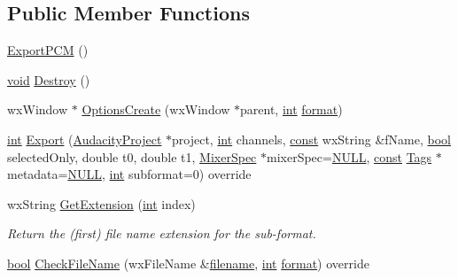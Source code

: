 \subsection*{Public Member Functions}
\begin{DoxyCompactItemize}
\item 
\hyperlink{class_export_p_c_m_aac3274e3407707edabbdc2b770ec5227}{Export\+P\+CM} ()
\item 
\hyperlink{sound_8c_ae35f5844602719cf66324f4de2a658b3}{void} \hyperlink{class_export_p_c_m_abcb80d618eb91c034cecc63dee678968}{Destroy} ()
\item 
wx\+Window $\ast$ \hyperlink{class_export_p_c_m_a35f9d0b0c2b57022bf2cf982489e959a}{Options\+Create} (wx\+Window $\ast$parent, \hyperlink{xmltok_8h_a5a0d4a5641ce434f1d23533f2b2e6653}{int} \hyperlink{_export_p_c_m_8cpp_a317afff57d87a89158c2b038d37b2b08}{format})
\item 
\hyperlink{xmltok_8h_a5a0d4a5641ce434f1d23533f2b2e6653}{int} \hyperlink{class_export_p_c_m_a76bda59ce41f9eef8f168914d6285abb}{Export} (\hyperlink{class_audacity_project}{Audacity\+Project} $\ast$project, \hyperlink{xmltok_8h_a5a0d4a5641ce434f1d23533f2b2e6653}{int} channels, \hyperlink{getopt1_8c_a2c212835823e3c54a8ab6d95c652660e}{const} wx\+String \&f\+Name, \hyperlink{mac_2config_2i386_2lib-src_2libsoxr_2soxr-config_8h_abb452686968e48b67397da5f97445f5b}{bool} selected\+Only, double t0, double t1, \hyperlink{class_mixer_spec}{Mixer\+Spec} $\ast$mixer\+Spec=\hyperlink{px__mixer_8h_a070d2ce7b6bb7e5c05602aa8c308d0c4}{N\+U\+LL}, \hyperlink{getopt1_8c_a2c212835823e3c54a8ab6d95c652660e}{const} \hyperlink{class_tags}{Tags} $\ast$metadata=\hyperlink{px__mixer_8h_a070d2ce7b6bb7e5c05602aa8c308d0c4}{N\+U\+LL}, \hyperlink{xmltok_8h_a5a0d4a5641ce434f1d23533f2b2e6653}{int} subformat=0) override
\item 
wx\+String \hyperlink{class_export_p_c_m_afab2bd1800b6a1efe1ccb69710e02f97}{Get\+Extension} (\hyperlink{xmltok_8h_a5a0d4a5641ce434f1d23533f2b2e6653}{int} index)
\begin{DoxyCompactList}\small\item\em Return the (first) file name extension for the sub-\/format. \end{DoxyCompactList}\item 
\hyperlink{mac_2config_2i386_2lib-src_2libsoxr_2soxr-config_8h_abb452686968e48b67397da5f97445f5b}{bool} \hyperlink{class_export_p_c_m_a16f1633b8326c80086c9ed4041dbac1e}{Check\+File\+Name} (wx\+File\+Name \&\hyperlink{test__portburn_8cpp_a7efa5e9c7494c7d4586359300221aa5d}{filename}, \hyperlink{xmltok_8h_a5a0d4a5641ce434f1d23533f2b2e6653}{int} \hyperlink{_export_p_c_m_8cpp_a317afff57d87a89158c2b038d37b2b08}{format}) override
\end{DoxyCompactItemize}
